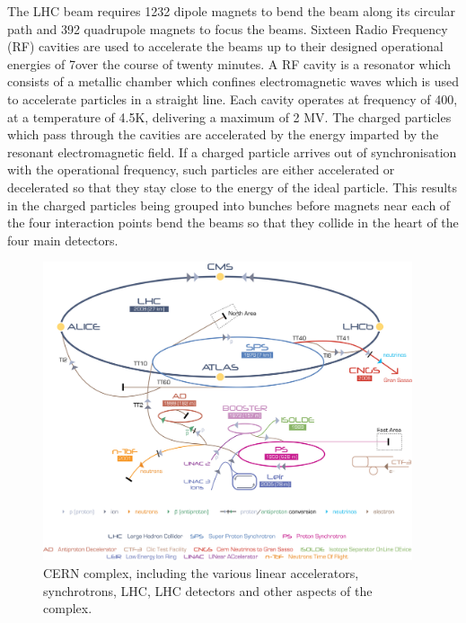 The LHC beam requires 1232 dipole magnets to bend the beam along its circular path and 392 quadrupole magnets to focus the beams. 
Sixteen Radio Frequency (RF) cavities are used to accelerate the beams up to their designed operational energies of 7\TeV over the course of twenty minutes. 
A RF cavity is a resonator which consists of a metallic chamber which confines electromagnetic waves which is used to accelerate particles in a straight line. 
Each cavity operates at frequency of 400\MHz, at a temperature of 4.5K, delivering a maximum of 2 MV. 
The charged particles which pass through the cavities are accelerated by the energy imparted by the resonant electromagnetic field. 
If a charged particle arrives out of synchronisation with the operational frequency, such particles are either accelerated or decelerated so that they stay close to the energy of the ideal particle. 
This results in the charged particles being grouped into bunches before magnets near each of the four interaction points bend the beams so that they collide in the heart of the four main detectors\cite{Bruning:782076}. 

\begin{figure}[htbp]
\begin{center}
\includegraphics[width=0.97\textwidth]{figs/lhc/Cern-Accelerator-Complex.jpg}
\caption{CERN complex, including the various linear accelerators, synchrotrons, LHC, LHC detectors and other aspects of the complex.}
\label{fig:cern-accelerator-complex}
\end{center}
\end{figure}
